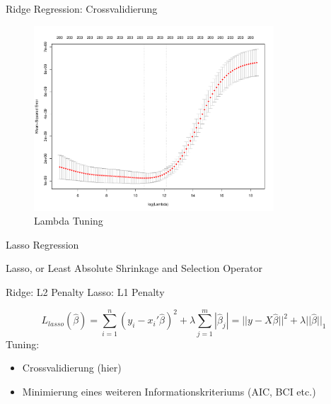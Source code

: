 \documentclass[10pt]{beamer}
\begin{document}
\begin{frame}{Ridge Regression: Crossvalidierung}

    \begin{figure}
        \centering
        \includegraphics[width=0.8\textwidth, keepaspectratio]{figures/ridge_tuning.pdf}
        \caption{Lambda Tuning}
    \end{figure}
    
\end{frame}

\begin{frame}{Lasso Regression}

    \begin{Large}{Lasso, or Least Absolute Shrinkage and Selection Operator}\end{Large}
    
    Ridge: L2 Penalty
    \newline
    Lasso: L1 Penalty
	
	\begin{equation*}
	L_{lasso}(\hat{\beta})=\sum_{i=1}^{n}(y_{i}-x_{i}'\hat{\beta})^2+\lambda\sum_{j=1}^{m}|\hat{\beta}_{j}|=||y-X\hat{\beta}||^2+\lambda||\hat{\beta}||_{1}
	\end{equation*}
    Tuning:
	\begin{itemize}
		\item Crossvalidierung (hier)
		\item Minimierung eines weiteren Informationskriteriums (AIC, BCI etc.)
	\end{itemize}
	
\end{frame}
\end{document}
